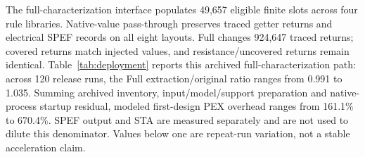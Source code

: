 The full-characterization interface populates 49,657 eligible finite slots across four rule libraries. Native-value pass-through preserves traced getter returns and electrical SPEF records on all eight layouts. Full changes 924,647 traced returns; covered returns match injected values, and resistance/uncovered returns remain identical. Table~\ref{tab:deployment} reports this archived full-characterization path: across 120 release runs, the Full extraction/original ratio ranges from 0.991 to 1.035. Summing archived inventory, input/model/support preparation and native-process startup residual, modeled first-design PEX overhead ranges from 161.1\% to 670.4\%. SPEF output and STA are measured separately and are not used to dilute this denominator. Values below one are repeat-run variation, not a stable acceleration claim.
